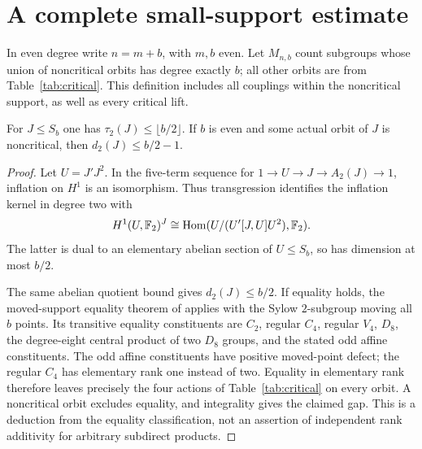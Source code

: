 \section{A complete small-support estimate}\label{sec:small-support}
In even degree write $n=m+b$, with $m,b$ even. Let $M_{n,b}$ count
subgroups whose union of noncritical orbits has degree exactly $b$;
all other orbits are from Table~\ref{tab:critical}. This definition
includes all couplings within the noncritical support, as well as
every critical lift.

\begin{lemma}\label{lem:permutation-terminal-parameters}
For $J\leq S_b$ one has $\tau_2(J)\leq\lfloor b/2\rfloor$.
If $b$ is even and some actual orbit of $J$ is noncritical, then
$d_2(J)\leq b/2-1$.
\end{lemma}
\begin{proof}
Let $U=J'J^2$. In the five-term sequence for $1\to U\to J\to A_2(J)\to1$,
inflation on $H^1$ is an isomorphism. Thus transgression identifies
the inflation kernel in degree two with
\[
 H^1(U,\mathbb F_2)^J\cong\operatorname{Hom}(U/(U'[J,U]U^2),\mathbb F_2).
\]
The latter is dual to an elementary abelian section of $U\leq S_b$,
so has dimension at most $b/2$.

The same abelian quotient bound gives $d_2(J)\leq b/2$.
If equality holds, the moved-support equality theorem of
\cite{KovacsPraeger1989} applies with the Sylow $2$-subgroup moving all
$b$ points. Its transitive equality constituents are $C_2$, regular
$C_4$, regular $V_4$, $D_8$, the degree-eight central product of two
$D_8$ groups, and the stated odd affine constituents. The odd affine
constituents have positive moved-point defect; the regular $C_4$ has
elementary rank one instead of two. Equality in elementary rank therefore
leaves precisely the four actions of Table~\ref{tab:critical} on every
orbit. A noncritical orbit excludes equality, and integrality gives
the claimed gap. This is a deduction from the equality classification,
not an assertion of independent rank additivity for arbitrary subdirect
products.
\end{proof}


